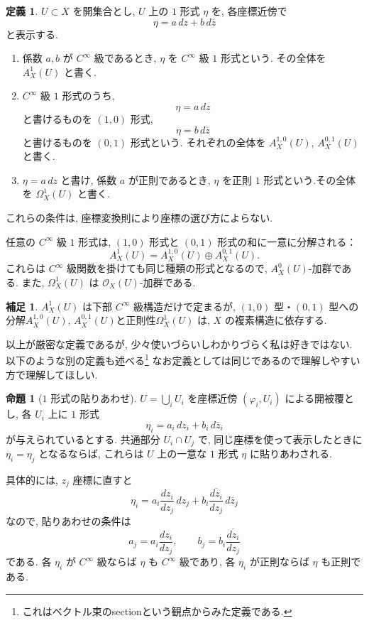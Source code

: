 \documentclass[dvipdfmx,a4paper,11pt]{article} %
\theoremstyle{definition}
\numberwithin{equation}{section}
\newtheorem{prop}[thm]{命題}
\newtheorem{dfn}[thm]{定義}
\newtheorem{rem}[thm]{補足}
\begin{document}
\begin{dfn}\label{O-M090}
$U\subset X$ を開集合とし, $U$ 上の $1$ 形式 $\eta$ を, 
各座標近傍で
\[
\eta=a\,dz+b\,d\overline z
\]
と表示する.
\begin{enumerate}
\item
係数 $a,b$ が $C^\infty$ 級であるとき, 
$\eta$ を $C^\infty$ 級 $1$ 形式という.
その全体を $A_X^1(U)$ と書く.

\item
$C^\infty$ 級 $1$ 形式のうち, 
\[
\eta=a\,dz
\]
と書けるものを $(1,0)$ 形式, 
\[
\eta=b\,d\overline z
\]
と書けるものを $(0,1)$ 形式という.
それぞれの全体を $A_X^{1,0}(U)$, $A_X^{0,1}(U)$ と書く.

\item
$\eta=a\,dz$ と書け, 係数 $a$ が正則であるとき, 
$\eta$ を正則 $1$ 形式という.その全体を $\Omega_X^1(U)$ と書く.
\end{enumerate}
これらの条件は, 座標変換則により座標の選び方によらない.
\end{dfn}

任意の $C^\infty$ 級 $1$ 形式は, 
$(1,0)$ 形式と $(0,1)$ 形式の和に一意に分解される：
\[
A_X^1(U)=A_X^{1,0}(U)\oplus A_X^{0,1}(U).
\]
これらは $C^\infty$ 級関数を掛けても同じ種類の形式となるので, 
$A_X^0(U)$-加群である.
また, $\Omega_X^1(U)$ は $\mathcal O_X(U)$-加群である.

\begin{rem}\label{O-M091}
$A_X^1(U)$ は下部 $C^\infty$ 級構造だけで定まるが, 
$(1,0)$ 型・$(0,1)$ 型への分解$A_X^{1,0}(U)$, $A_X^{0,1}(U)$と正則性$\Omega_X^1(U)$ は, 
$X$ の複素構造に依存する.
\end{rem}

以上が厳密な定義であるが, 少々使いづらいしわかりづらく私は好きではない. 
以下のような別の定義も述べる\footnote{これはベクトル束のsectionという観点からみた定義である.}
なお定義としては同じであるので理解しやすい方で理解してほしい. 

\begin{prop}[$1$ 形式の貼りあわせ]\label{prop-gluing-one-forms}
$U=\bigcup_i U_i$ を座標近傍 $(\varphi_i,U_i)$ による開被覆とし, 
各 $U_i$ 上に $1$ 形式
\[
\eta_i=a_i\,dz_i+b_i\,d\overline z_i
\]
が与えられているとする.
共通部分 $U_i\cap U_j$ で, 同じ座標を使って表示したときに
$\eta_i=\eta_j$ となるならば, 
これらは $U$ 上の一意な $1$ 形式 $\eta$ に貼りあわされる.

具体的には, $z_j$ 座標に直すと
\[
\eta_i
=a_i\frac{dz_i}{dz_j}\,dz_j
+b_i\overline{\frac{dz_i}{dz_j}}\,d\overline z_j
\]
なので, 貼りあわせの条件は
\[
a_j=a_i\frac{dz_i}{dz_j},\qquad
b_j=b_i\overline{\frac{dz_i}{dz_j}}
\]
である.
各 $\eta_i$ が $C^\infty$ 級ならば $\eta$ も $C^\infty$ 級であり, 
各 $\eta_i$ が正則ならば $\eta$ も正則である.
\end{prop}
\end{document}
